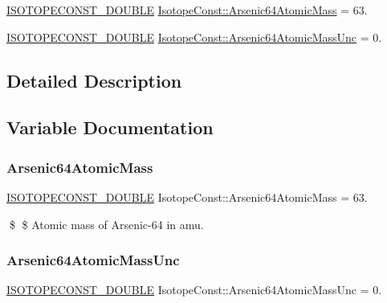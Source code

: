 \begin{DoxyCompactItemize}
\item 
\mbox{\hyperlink{group___isotope_const-_macros_ga8f45a7272ce02c0b4c65c44636ed719a}{I\+S\+O\+T\+O\+P\+E\+C\+O\+N\+S\+T\+\_\+\+D\+O\+U\+B\+LE}} \mbox{\hyperlink{group___isotope_const-_arsenic-_as64_ga4dd85b20bc08710e0d630db172b37853}{Isotope\+Const\+::\+Arsenic64\+Atomic\+Mass}} = 63.
\item 
\mbox{\hyperlink{group___isotope_const-_macros_ga8f45a7272ce02c0b4c65c44636ed719a}{I\+S\+O\+T\+O\+P\+E\+C\+O\+N\+S\+T\+\_\+\+D\+O\+U\+B\+LE}} \mbox{\hyperlink{group___isotope_const-_arsenic-_as64_gad43b1fe66be1c546d734b4f2a3c81ffc}{Isotope\+Const\+::\+Arsenic64\+Atomic\+Mass\+Unc}} = 0.
\end{DoxyCompactItemize}


\subsection{Detailed Description}


\subsection{Variable Documentation}
\mbox{\label{group___isotope_const-_arsenic-_as64_ga4dd85b20bc08710e0d630db172b37853}} 
\subsubsection{\texorpdfstring{Arsenic64\+Atomic\+Mass}{Arsenic64AtomicMass}}
{\footnotesize\ttfamily \mbox{\hyperlink{group___isotope_const-_macros_ga8f45a7272ce02c0b4c65c44636ed719a}{I\+S\+O\+T\+O\+P\+E\+C\+O\+N\+S\+T\+\_\+\+D\+O\+U\+B\+LE}} Isotope\+Const\+::\+Arsenic64\+Atomic\+Mass = 63.}

\$ \$ Atomic mass of Arsenic-\/64 in amu. \mbox{\label{group___isotope_const-_arsenic-_as64_gad43b1fe66be1c546d734b4f2a3c81ffc}} 
\subsubsection{\texorpdfstring{Arsenic64\+Atomic\+Mass\+Unc}{Arsenic64AtomicMassUnc}}
{\footnotesize\ttfamily \mbox{\hyperlink{group___isotope_const-_macros_ga8f45a7272ce02c0b4c65c44636ed719a}{I\+S\+O\+T\+O\+P\+E\+C\+O\+N\+S\+T\+\_\+\+D\+O\+U\+B\+LE}} Isotope\+Const\+::\+Arsenic64\+Atomic\+Mass\+Unc = 0.}

